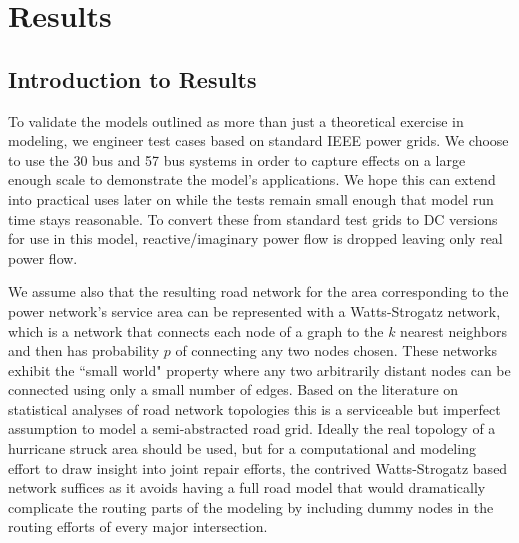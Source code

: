 \chapter{Results}
%
\section{Introduction to Results}
To validate the models outlined as more than just a theoretical exercise in modeling, we engineer test cases based on standard IEEE power grids. We choose to use the 30 bus and 57 bus systems in order to capture effects on a large enough scale to demonstrate the model's applications. We hope this can extend into practical uses later on while the tests remain small enough that model run time stays reasonable. To convert these from standard test grids to DC versions for use in this model, reactive/imaginary power flow is dropped leaving only real power flow.

We assume also that the resulting road network for the area corresponding to the power network's service area can be represented with a Watts-Strogatz network, which is a network that connects each node of a graph to the $k$ nearest neighbors and then has probability $p$ of connecting any two nodes chosen. These networks exhibit the ``small world" property where any two arbitrarily distant nodes can be connected using only a small number of edges. Based on the literature on statistical analyses of road network topologies \cite{LammerEA2006} \cite{ChanEA2011} this is a serviceable but imperfect assumption to model  a semi-abstracted road grid. Ideally the real topology of a hurricane struck area should be used, but for a computational and modeling effort to draw insight into joint repair efforts, the contrived Watts-Strogatz based network suffices as it avoids having a full road model that would dramatically complicate the routing parts of the modeling by including dummy nodes in the routing efforts of every major intersection.

